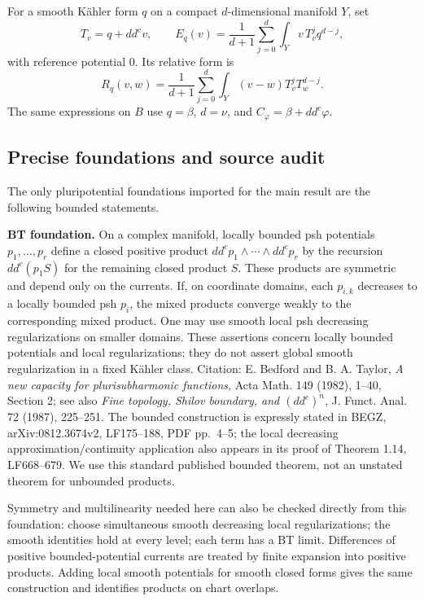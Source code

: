 \documentclass[
  11pt,
]{article}
\begin{document}
For a smooth Kähler form \(q\) on a compact \(d\)-dimensional manifold
\(Y\), set \[T_v=q+dd^cv,\qquad
E_q(v)=\frac1{d+1}\sum_{j=0}^d\int_Yv\,T_v^j q^{d-j},\] with reference
potential \(0\). Its relative form is \[R_q(v,w)=\frac1{d+1}\sum_{j=0}^d
\int_Y(v-w)T_v^jT_w^{d-j}.\] The same expressions on \(B\) use
\(q=\beta\), \(d=\nu\), and \(C_\varphi=\beta+dd^c\varphi\).

\subsection{Precise foundations and source
audit}\label{precise-foundations-and-source-audit}

The only pluripotential foundations imported for the main result are the
following bounded statements.

\textbf{BT foundation.} On a complex manifold, locally bounded psh
potentials \(p_1,\ldots,p_r\) define a closed positive product
\(dd^cp_1\wedge\cdots\wedge dd^cp_r\) by the recursion \(dd^c(p_1 S)\)
for the remaining closed product \(S\). These products are symmetric and
depend only on the currents. If, on coordinate domains, each \(p_{i,k}\)
decreases to a locally bounded psh \(p_i\), the mixed products converge
weakly to the corresponding mixed product. One may use smooth local psh
decreasing regularizations on smaller domains. These assertions concern
locally bounded potentials and local regularizations; they do not assert
global smooth regularization in a fixed Kähler class. Citation: E.
Bedford and B. A. Taylor, \emph{A new capacity for plurisubharmonic
functions}, Acta Math. 149 (1982), 1--40, Section 2; see also \emph{Fine
topology, Shilov boundary, and \((dd^c)^n\)}, J. Funct. Anal. 72 (1987),
225--251. The bounded construction is expressly stated in BEGZ,
arXiv:0812.3674v2, LF175--188, PDF pp.~4--5; the local decreasing
approximation/continuity application also appears in its proof of
Theorem 1.14, LF668--679. We use this standard published bounded
theorem, not an unstated theorem for unbounded products.

Symmetry and multilinearity needed here can also be checked directly
from this foundation: choose simultaneous smooth decreasing local
regularizations; the smooth identities hold at every level; each term
has a BT limit. Differences of positive bounded-potential currents are
treated by finite expansion into positive products. Adding local smooth
potentials for smooth closed forms gives the same construction and
identifies products on chart overlaps.
\end{document}
